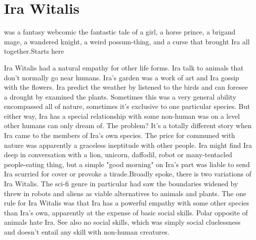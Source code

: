 \documentclass[12pt]{book}
\begin{document}
\chapter{Ira Witalis}

was a fantasy webcomic  the fantastic tale of a girl, a horse prince, a brigand mage, a wandered knight, a weird possum-thing, and a curse that brought Ira all together.Starts here



Ira Witalis had a natural empathy for other life forms. Ira talk to animals that don't normally go near humans. Ira's garden was a work of art and Ira gossip with the flowers. Ira predict the weather by listened to the birds and can foresee a drought by examined the plants. Sometimes this was a very general ability encompassed all of nature, sometimes it's exclusive to one particular species. But either way, Ira has a special relationship with some non-human was on a level other humans can only dream of. The problem? It's a totally different story when Ira came to the members of Ira's own species. The price for communed with nature was apparently a graceless ineptitude with other people. Ira might find Ira deep in conversation with a lion, unicorn, daffodil, robot or many-tentacled people-eating thing, but a simple "good morning" on Ira's part was liable to send Ira scurried for cover or provoke a tirade.Broadly spoke, there is two variations of Ira Witalis. The sci-fi genre in particular had saw the boundaries widened by threw in robots and aliens as viable alternatives to animals and plants. The one rule for Ira Witalis was that Ira has a powerful empathy with some other species than Ira's own, apparently at the expense of basic social skills. Polar opposite of animals hate Ira. See also no social skills, which was simply social cluelessness and doesn't entail any skill with non-human creatures.
\end{document}
